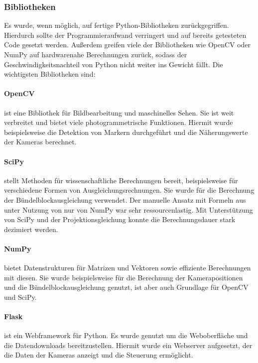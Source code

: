 \documentclass[./00PhotoBox.tex]{subfiles}
\begin{document}
\subsubsection{Bibliotheken}
Es wurde, wenn möglich, auf fertige Python-Bibliotheken zurückgegriffen. Hierdurch sollte der Programmieraufwand verringert und auf bereits getesteten Code gesetzt werden. Außerdem greifen viele der Bibliotheken wie OpenCV oder NumPy auf hardwarenahe Berechnungen zurück, sodass der Geschwindigkeitsnachteil von Python nicht weiter ins Gewicht fällt. Die wichtigsten Bibliotheken sind:

\paragraph{OpenCV}
ist eine Bibliothek für Bildbearbeitung und maschinelles Sehen. Sie ist weit verbreitet und bietet viele photogrammetrische Funktionen. Hiermit wurde beispielsweise die Detektion von Markern durchgeführt und die Näherungswerte der Kameras berechnet.

\paragraph{SciPy}
stellt Methoden für wissenschaftliche Berechnungen bereit, beispielsweise für verschiedene Formen von Ausgleichungsrechnungen. Sie wurde für die Berechnung der Bündelblockausgleichung verwendet. Der manuelle Ansatz mit Formeln aus \cite{luhmann} unter Nutzung von nur von NumPy war sehr ressourcenlastig. Mit Unterstützung von SciPy und der Projektionsgleichung konnte die Berechnungsdauer stark dezimiert werden.

\paragraph{NumPy}
bietet Datenstrukturen für Matrizen und Vektoren sowie effiziente Berechnungen mit diesen. Sie wurde beispielsweise für die Berechnung der Kamerapositionen und die Bündelblockausgleichung genutzt, ist aber auch Grundlage für OpenCV und SciPy.


\paragraph{Flask}
ist ein Webframework für Python. Es wurde genutzt um die Weboberfläche und die Datendownloads bereitzustellen. Hiermit wurde ein Webserver aufgesetzt, der die Daten der Kameras anzeigt und die Steuerung ermöglicht.
\end{document}

